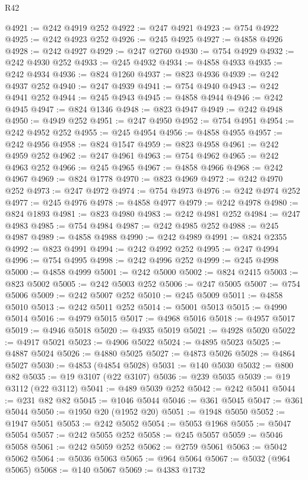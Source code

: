 \begin{lexlean}{R42}
\begin{coremodule}
{@4921 := @242 @4919 @252
@4922 := @247 @4921
@4923 := @754 @4922
@4925 := @242 @4923 @252
@4926 := @245 @4925
@4927 := @4858 @4926
@4928 := @242 @4927
@4929 := @247 @2760
@4930 := @754 @4929
@4932 := @242 @4930 @252
@4933 := @245 @4932
@4934 := @4858 @4933
@4935 := @242 @4934
@4936 := @824 @1260
@4937 := @823 @4936
@4939 := @242 @4937 @252
@4940 := @247 @4939
@4941 := @754 @4940
@4943 := @242 @4941 @252
@4944 := @245 @4943
@4945 := @4858 @4944
@4946 := @242 @4945
@4947 := @824 @1346
@4948 := @823 @4947
@4949 := @242 @4948
@4950 := @4949 @252
@4951 := @247 @4950
@4952 := @754 @4951
@4954 := @242 @4952 @252
@4955 := @245 @4954
@4956 := @4858 @4955
@4957 := @242 @4956
@4958 := @824 @1547
@4959 := @823 @4958
@4961 := @242 @4959 @252
@4962 := @247 @4961
@4963 := @754 @4962
@4965 := @242 @4963 @252
@4966 := @245 @4965
@4967 := @4858 @4966
@4968 := @242 @4967
@4969 := @824 @1778
@4970 := @823 @4969
@4972 := @242 @4970 @252
@4973 := @247 @4972
@4974 := @754 @4973
@4976 := @242 @4974 @252
@4977 := @245 @4976
@4978 := @4858 @4977
@4979 := @242 @4978
@4980 := @824 @1893
@4981 := @823 @4980
@4983 := @242 @4981 @252
@4984 := @247 @4983
@4985 := @754 @4984
@4987 := @242 @4985 @252
@4988 := @245 @4987
@4989 := @4858 @4988
@4990 := @242 @4989
@4991 := @824 @2355
@4992 := @823 @4991
@4994 := @242 @4992 @252
@4995 := @247 @4994
@4996 := @754 @4995
@4998 := @242 @4996 @252
@4999 := @245 @4998
@5000 := @4858 @4999
@5001 := @242 @5000
@5002 := @824 @2415
@5003 := @823 @5002
@5005 := @242 @5003 @252
@5006 := @247 @5005
@5007 := @754 @5006
@5009 := @242 @5007 @252
@5010 := @245 @5009
@5011 := @4858 @5010
@5013 := @242 @5011 @252
@5014 := @5001 @5013
@5015 := @4990 @5014
@5016 := @4979 @5015
@5017 := @4968 @5016
@5018 := @4957 @5017
@5019 := @4946 @5018
@5020 := @4935 @5019
@5021 := @4928 @5020
@5022 := @4917 @5021
@5023 := @4906 @5022
@5024 := @4895 @5023
@5025 := @4887 @5024
@5026 := @4880 @5025
@5027 := @4873 @5026
@5028 := @4864 @5027
@5030 := @4853 (@4854 @5028)
@5031 := @140 @5030
@5032 := @800 @82
@5035 := @19 @3107 (@22 @3107)
@5036 := @239 @5035
@5039 := @19 @3112 (@22 @3112)
@5041 := @489 @5039 @252
@5042 := @242 @5041
@5044 := @231 @82 @82
@5045 := @1046 @5044
@5046 := @361 @5045
@5047 := @361 @5044
@5050 := @1950 @20 (@1952 @20)
@5051 := @1948 @5050
@5052 := @1947 @5051
@5053 := @242 @5052
@5054 := @5053 @1968
@5055 := @5047 @5054
@5057 := @242 @5055 @252
@5058 := @245 @5057
@5059 := @5046 @5058
@5061 := @242 @5059 @252
@5062 := @2759 @5061
@5063 := @5042 @5062
@5064 := @5036 @5063
@5065 := @964 @5064
@5067 := @5032 (@964 @5065)
@5068 := @140 @5067
@5069 := @4383 @1732
}
\end{coremodule}
\end{lexlean}
